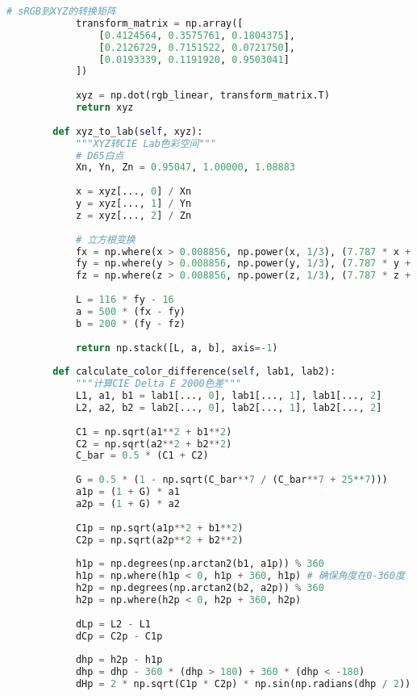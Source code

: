 \begin{lstlisting}[language=Python]
            # sRGB到XYZ的转换矩阵
            transform_matrix = np.array([
                [0.4124564, 0.3575761, 0.1804375],
                [0.2126729, 0.7151522, 0.0721750],
                [0.0193339, 0.1191920, 0.9503041]
            ])
            
            xyz = np.dot(rgb_linear, transform_matrix.T)
            return xyz
        
        def xyz_to_lab(self, xyz):
            """XYZ转CIE Lab色彩空间"""
            # D65白点
            Xn, Yn, Zn = 0.95047, 1.00000, 1.08883
            
            x = xyz[..., 0] / Xn
            y = xyz[..., 1] / Yn
            z = xyz[..., 2] / Zn
            
            # 立方根变换
            fx = np.where(x > 0.008856, np.power(x, 1/3), (7.787 * x + 16/116))
            fy = np.where(y > 0.008856, np.power(y, 1/3), (7.787 * y + 16/116))
            fz = np.where(z > 0.008856, np.power(z, 1/3), (7.787 * z + 16/116))
            
            L = 116 * fy - 16
            a = 500 * (fx - fy)
            b = 200 * (fy - fz)
            
            return np.stack([L, a, b], axis=-1)
        
        def calculate_color_difference(self, lab1, lab2):
            """计算CIE Delta E 2000色差"""
            L1, a1, b1 = lab1[..., 0], lab1[..., 1], lab1[..., 2]
            L2, a2, b2 = lab2[..., 0], lab2[..., 1], lab2[..., 2]
    
            C1 = np.sqrt(a1**2 + b1**2)
            C2 = np.sqrt(a2**2 + b2**2)
            C_bar = 0.5 * (C1 + C2)
    
            G = 0.5 * (1 - np.sqrt(C_bar**7 / (C_bar**7 + 25**7)))
            a1p = (1 + G) * a1
            a2p = (1 + G) * a2
    
            C1p = np.sqrt(a1p**2 + b1**2)
            C2p = np.sqrt(a2p**2 + b2**2)
    
            h1p = np.degrees(np.arctan2(b1, a1p)) % 360
            h1p = np.where(h1p < 0, h1p + 360, h1p) # 确保角度在0-360度
            h2p = np.degrees(np.arctan2(b2, a2p)) % 360
            h2p = np.where(h2p < 0, h2p + 360, h2p)
    
            dLp = L2 - L1
            dCp = C2p - C1p
    
            dhp = h2p - h1p
            dhp = dhp - 360 * (dhp > 180) + 360 * (dhp < -180)
            dHp = 2 * np.sqrt(C1p * C2p) * np.sin(np.radians(dhp / 2))
    

\end{lstlisting}
